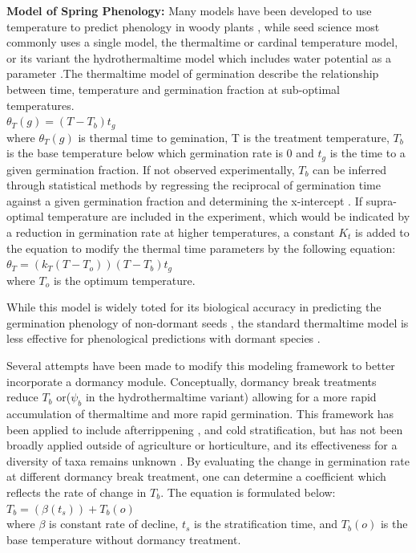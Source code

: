 \documentclass{article}\usepackage[]{graphicx}\usepackage[]{color}
\begin{document}
\textbf{Model of Spring Phenology:} Many models have been developed to use temperature to predict phenology in woody plants \citep{Chuine2002}, while seed science most commonly uses a single model, the thermaltime or cardinal temperature model, or its variant the hydrothermaltime model which includes water potential as a parameter \citep {Bradford2002}.The thermaltime model of germination describe the relationship between time, temperature and germination fraction at sub-optimal temperatures.\\
\indent$\theta_{T}(g)=(T-T_{b})t_{g}$\\
where $\theta_{T}(g)$ is thermal time to gemination, T is the treatment temperature, $T_b$ is the base temperature below which germination rate is 0 and $t_g$ is the time to a given germination fraction. If not observed experimentally, $T_b$ can be inferred through statistical methods by regressing the reciprocal of germination time against a given germination fraction and determining the x-intercept \citep{Pritchard1999}.
If supra-optimal temperature are included in the experiment, which would be indicated by a reduction in germination rate at higher temperatures, a constant $K_t$ is added to the equation to modify the thermal time parameters by the following equation:\\
\indent$\theta_{T}=(k_{T}(T-T_{o}))(T-T_{b})t_{g}$\\
where $T_o$ is the optimum temperature.
\par While this model is widely toted for its biological accuracy in predicting the germination phenology of non-dormant seeds \citep{Bradford2005}, the standard thermaltime model is less effective for phenological predictions with dormant species \citep{Batlla2015}.
\par Several attempts have been made to modify this modeling framework to better incorporate a dormancy module. Conceptually, dormancy break treatments reduce $T_b$ or($\psi_b$ in the hydrothermaltime variant) allowing for a more rapid accumulation of thermaltime and more rapid germination. This framework has been applied to include afterrippening \citep{Meyer2000}, and cold stratification\citep{Pritchard1996,Batlla2003}, but has not been broadly applied outside of agriculture or horticulture, and its effectiveness for a diversity of taxa remains unknown \citep{Steadman2004}. By evaluating the change in germination rate at different dormancy break treatment, one can determine a coefficient which reflects the rate of change in $T_b$. The equation is formulated below:\\
\indent$T_b= (\beta(t_s))+T_b(o)$\\
where $\beta$ is constant rate of decline, $t_s$ is the stratification time, and $T_b(o)$ is the base temperature without dormancy treatment.
\end{document}
